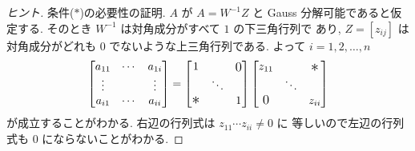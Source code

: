 \documentclass[12pt,twoside]{jarticle}
\begin{document}
\begin{proof}[ヒント]
  条件($*$)の必要性の証明.
  $A$ が $A=W^{-1}Z$ と Gauss 分解可能であると仮定する. 
  そのとき $W^{-1}$ は対角成分がすべて $1$ の下三角行列で
  あり, $Z=[z_{ij}]$ は対角成分がどれも $0$ でないような上三角行列である.
  よって $i=1,2,\ldots,n$
  \begin{equation*}
    \begin{bmatrix}
      a_{11} & \cdots & a_{1i} \\
      \vdots &        & \vdots \\
      a_{i1} & \cdots & a_{ii} \\
    \end{bmatrix}
    =
    \begin{bmatrix}
      1 &        & \bigzerou \\
        & \ddots & \\
      \bigstarl && 1 \\
    \end{bmatrix}
    \begin{bmatrix}
      z_{11} &        & \bigstaru \\
             & \ddots & \\
      \bigzerol &     & z_{ii} \\
    \end{bmatrix}
  \end{equation*}
  が成立することがわかる. 右辺の行列式は $z_{11}\cdots z_{ii}\ne 0$ に
  等しいので左辺の行列式も $0$ にならないことがわかる.


\end{proof}
\end{document}
